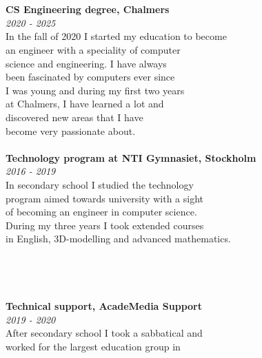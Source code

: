 \documentclass[11pt,oneside,a4paper,titlepage]{article}
\begin{document}
\begin{tcolorbox}
\begin{minipage}[t]{12cm}
        \begin{tcolorbox}[grow to left by=-10pt,colframe=white,colback=white,sharp corners]
            {\selectfont
                \\
                \\\textbf{CS Engineering degree, Chalmers} \\
                \emph{2020 - 2025} \\
                In the fall of 2020 I started my education to become\\
                an engineer with a speciality of computer\\
                science and engineering. I have always\\
                been fascinated by computers ever since\\
                I was young and during my first two years\\
                at Chalmers, I have learned a lot and\\
                discovered new areas that I have\\
                become very passionate about.\\\\
                \textbf{Technology program at NTI Gymnasiet, Stockholm} \\
                \emph{2016 - 2019} \\
                In secondary school I studied the technology\\
                program aimed towards university with a sight\\
                of becoming an engineer in computer science.\\
                During my three years I took extended courses\\
                in English, 3D-modelling and advanced mathematics.\\\\\\
                \\
                \\\textbf{Technical support, AcadeMedia Support}\\
                \emph{2019 - 2020}\\
                After secondary school I took a sabbatical and\\
                worked for the largest education group in\\
}
\end{tcolorbox}
\end{minipage}
\end{tcolorbox}
\end{document}
